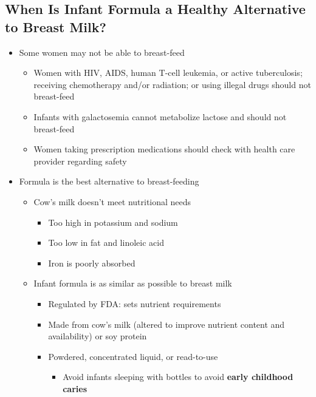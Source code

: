 \documentclass[12pt]{article}
\begin{document}
        \subsection{When Is Infant Formula a Healthy Alternative to Breast Milk?}
            \begin{itemize}
                \item Some women may not be able to breast-feed
                    \begin{itemize}
                        \item Women with HIV, AIDS, human T-cell leukemia, or active tuberculosis; receiving chemotherapy and/or radiation; or using illegal drugs should not breast-feed
                        \item Infants with galactosemia cannot metabolize lactose and should not breast-feed
                        \item Women taking prescription medications should check with health care provider regarding safety
                    \end{itemize}
                \item Formula is the best alternative to breast-feeding
                    \begin{itemize}
                        \item Cow's milk doesn't meet nutritional needs
                            \begin{itemize}
                                \item Too high in potassium and sodium
                                \item Too low in fat and linoleic acid
                                \item Iron is poorly absorbed
                            \end{itemize}
                        \item Infant formula is as similar as possible to breast milk
                            \begin{itemize}
                                \item Regulated by FDA: sets nutrient requirements
                                \item Made from cow's milk (altered to improve nutrient content and availability) or soy protein
                                \item Powdered, concentrated liquid, or read-to-use
                                    \begin{itemize}
                                        \item Avoid infants sleeping with bottles to avoid \textbf{early childhood caries}
                                    \end{itemize}
                            \end{itemize}
                    \end{itemize}
            \end{itemize}
\end{document}
